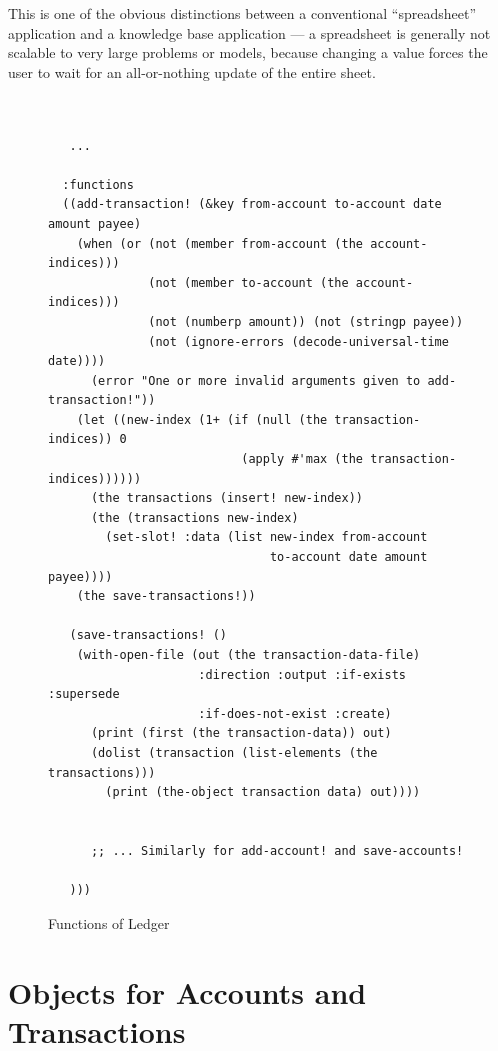 \documentclass [11pt]{book}
\begin{document}
This is one of the obvious distinctions between a conventional ``spreadsheet'' 
application and a knowledge base application --- a spreadsheet is generally not 
scalable to very large problems or models, because changing a value forces the 
user to wait for an all-or-nothing update of the entire sheet.
\begin{figure}
\begin{lrbox}{\boxedverb}
\begin{minipage}{\linewidth}
\small{

\begin{verbatim}


   ...

  :functions
  ((add-transaction! (&key from-account to-account date amount payee)
    (when (or (not (member from-account (the account-indices)))
              (not (member to-account (the account-indices)))
              (not (numberp amount)) (not (stringp payee))
              (not (ignore-errors (decode-universal-time date))))
      (error "One or more invalid arguments given to add-transaction!"))
    (let ((new-index (1+ (if (null (the transaction-indices)) 0 
                           (apply #'max (the transaction-indices))))))
      (the transactions (insert! new-index))
      (the (transactions new-index) 
        (set-slot! :data (list new-index from-account 
                               to-account date amount payee))))
    (the save-transactions!))
   
   (save-transactions! ()
    (with-open-file (out (the transaction-data-file) 
                     :direction :output :if-exists :supersede 
                     :if-does-not-exist :create)
      (print (first (the transaction-data)) out)
      (dolist (transaction (list-elements (the transactions)))
        (print (the-object transaction data) out))))

   
      ;; ... Similarly for add-account! and save-accounts!

   )))

\end{verbatim}}
\end{minipage}
\end{lrbox}
\fbox{\usebox{\boxedverb}}

\caption{Functions of Ledger}

\label{fig:genacc2-functions}

\end{figure}


\section{Objects for Accounts and Transactions}
\end{document}
